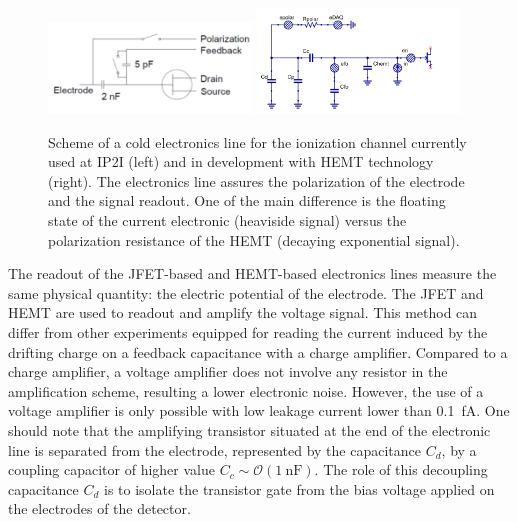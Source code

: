 \begin{figure}
\centering
\includegraphics[width=0.48\textwidth]{Figures/Electrodes/electronic_ion_ip2i.png}
\includegraphics[width=0.48\textwidth]{Figures/Electrodes/electronic_ion_hemt.png}
\caption{Scheme of a cold electronics line for the ionization channel currently used at IP2I (left) and in development with HEMT technology (right). The electronics line assures the polarization of the electrode and the signal readout. One of the main difference is the floating state of the current electronic (heaviside signal) versus the polarization resistance of the HEMT (decaying exponential signal).}
\label{fig:electronics-scheme}
\end{figure}

The readout of the JFET-based and HEMT-based electronics lines measure the same physical quantity: the electric potential of the electrode. The JFET and HEMT are used to readout and amplify the voltage signal. This method can differ from other experiments equipped for reading the current induced by the drifting charge on a feedback capacitance with a charge amplifier. Compared to a charge amplifier, a voltage amplifier does not involve any resistor in the amplification scheme, resulting a lower electronic noise. However, the use of a voltage amplifier is only possible with low leakage current lower than \SI{0.1}{\femto\ampere}.
One should note that the amplifying transistor situated at the end of the electronic line is separated from the electrode, represented by the capacitance $C_d$, by a coupling capacitor of higher value $C_c \sim \mathcal{O}(\SI{1}{\nano\farad})$.
The role of this decoupling capacitance $C_d$ is to isolate the transistor gate from the bias voltage applied on the electrodes of the detector.

